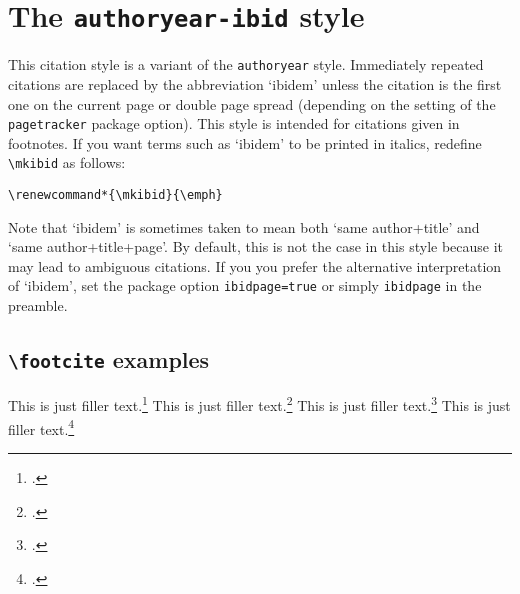 \documentclass[a4paper]{article}
\newcommand{\cmd}[1]{\texttt{\textbackslash #1}}
\begin{document}
\section*{The \texttt{authoryear-ibid} style}

This citation style is a variant of the \texttt{authoryear} style.
Immediately repeated citations are replaced by the abbreviation
`ibidem' unless the citation is the first one on the current page or
double page spread (depending on the setting of the
\texttt{pagetracker} package option). This style is intended for
citations given in footnotes. If you want terms such as `ibidem' to
be printed in italics, redefine \cmd{mkibid} as follows:

\begin{verbatim}
\renewcommand*{\mkibid}{\emph}
\end{verbatim}
%
Note that `ibidem' is sometimes taken to mean both `same
author+title' and `same author+title+page'. By default, this is not
the case in this style because it may lead to ambiguous citations.
If you you prefer the alternative interpretation of `ibidem', set
the package option \texttt{ibidpage=true} or simply
\texttt{ibidpage} in the preamble.

\subsection*{\cmd{footcite} examples}

This is just filler text.\footcite{companion}
This is just filler text.\footcite{companion}
\clearpage
This is just filler text.\footcite[55]{companion}
This is just filler text.\footcite[55]{companion}

\clearpage
\printbibliography
\end{document}
